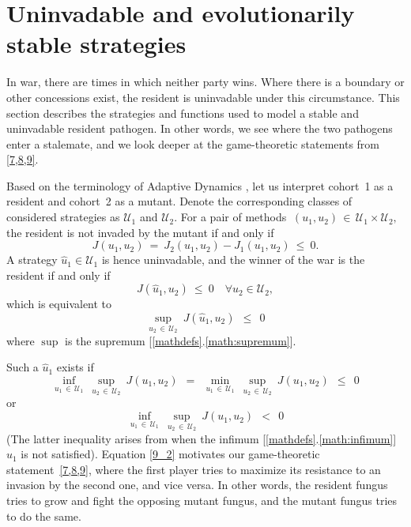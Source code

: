 \documentclass[11pt]{amsart}
\begin{document}
\section{Uninvadable and evolutionarily stable strategies}
In war, there are times in which neither party wins. Where there is a boundary or other concessions exist, the resident is uninvadable under this circumstance. This section describes the strategies and functions used to model a stable and uninvadable resident pathogen. In other words, we see where the two pathogens enter a stalemate, and we look deeper at the game-theoretic statements from {\rm \cref{7,8,9}}.

Based on the terminology of Adaptive Dynamics \cite{DercoleRinaldi2008}, let
us interpret cohort~{\rm 1} as a resident and cohort~{\rm 2} as a mutant.
Denote the corresponding classes of considered strategies as $ \mathcal{U}_1 $
and $ \mathcal{U}_2 $. For a pair of methods
$ \: (u_1, u_2) \, \in \, \mathcal{U}_1 \times \mathcal{U}_2, \: $
the resident is not invaded by the mutant if and only if
$$
J(u_1, u_2) \: = \: J_2(u_1, u_2) - J_1(u_1, u_2) \: \leqslant \: 0.
$$
A strategy 
$ \hat{u}_1 \in \mathcal{U}_1 $
is hence uninvadable, and the winner of the war is the resident if and only if
$$
J \left( \hat{u}_1, u_2 \right) \: \leqslant \: 0 \quad \forall u_2 \in
  \mathcal{U}_2,
$$
which is equivalent to
$$
\sup_{u_2 \, \in \, \mathcal{U}_2} \: J \left( \hat{u}_1, u_2 \right) \:\:
  \leqslant \:\: 0
$$
where $\sup$ is the supremum [\ref{mathdefs}.\ref{math:supremum}].


Such a $ \hat{u}_1 $ exists if
\begin{equation}
\inf_{u_1 \, \in \, \mathcal{U}_1} \: \sup_{u_2 \, \in \, \mathcal{U}_2} \:
  J(u_1, u_2) \:\: = \:\:
\min_{u_1 \, \in \, \mathcal{U}_1} \: \sup_{u_2 \, \in \, \mathcal{U}_2} \:
  J(u_1, u_2) \:\: \leqslant \:\: 0  \label{9_2}
\end{equation}
or
\begin{equation}
\inf_{u_1 \, \in \, \mathcal{U}_1} \: \sup_{u_2 \, \in \, \mathcal{U}_2} \:
  J(u_1, u_2) \:\: < \:\: 0  \label{9_4}
\end{equation}
(The latter inequality arises from when the infimum [\ref{mathdefs}.\ref{math:infimum}] $u_1$ is not satisfied).
Equation \cref{9_2} motivates our game-theoretic statement~{\rm \cref{7,8,9},}
where the first player tries to maximize its resistance to an invasion by the
second one{\rm ,} and vice versa. In other words, the resident fungus tries to grow and fight the opposing mutant fungus, and the mutant fungus tries to do the same.
\end{document}
